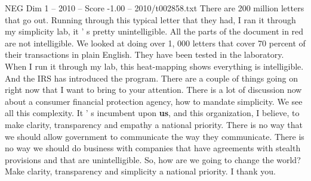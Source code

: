 \begin{textsample}{NEG Dim 1 – 2010 – Score -1.00 – 2010/t002858.txt}
There are 200 million letters that go out.
Running through this typical letter that they had, I ran it through my simplicity lab, it ' s pretty unintelligible.
All the parts of the document in red are not intelligible.
We looked at doing over 1, 000 letters that cover 70 percent of their transactions in plain English.
They have been tested in the laboratory.
When I run it through my lab, this heat-mapping shows everything is intelligible.
And the IRS has introduced the program.
There are a couple of things going on right now that I want to bring to your attention.
There is a lot of discussion now about a consumer financial protection agency, how to mandate simplicity.
We see all this complexity.
It ' s incumbent upon \textbf{us}, and this organization, I believe, to make clarity, transparency and empathy a national priority.
There is no way that we should allow government to communicate the way they communicate.
There is no way we should do business with companies that have agreements with stealth provisions and that are unintelligible.
So, how are we going to change the world?
Make clarity, transparency and simplicity a national priority.
I thank you.

\end{textsample}
